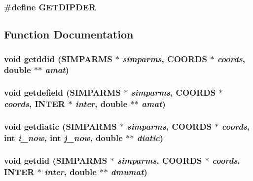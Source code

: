 \subsubsection{\setlength{\rightskip}{0pt plus 5cm}\#define GETDIPDER}\label{energy_2polar_2getdid_8c_e8acea768e4d2fdc6e985d261f4ce131}




\subsection{Function Documentation}
\subsubsection{\setlength{\rightskip}{0pt plus 5cm}void getddid ({\bf SIMPARMS} $\ast$ {\em simparms}, {\bf COORDS} $\ast$ {\em coords}, double $\ast$$\ast$ {\em amat})}\label{energy_2polar_2getdid_8c_3bec01b2ac3a2c818399ae1fd8ce6118}


\subsubsection{\setlength{\rightskip}{0pt plus 5cm}void getdefield ({\bf SIMPARMS} $\ast$ {\em simparms}, {\bf COORDS} $\ast$ {\em coords}, {\bf INTER} $\ast$ {\em inter}, double $\ast$$\ast$ {\em amat})}\label{energy_2polar_2getdid_8c_60064eed375ddf1edd5fadec212de99d}


\subsubsection{\setlength{\rightskip}{0pt plus 5cm}void getdiatic ({\bf SIMPARMS} $\ast$ {\em simparms}, {\bf COORDS} $\ast$ {\em coords}, int {\em i\_\-now}, int {\em j\_\-now}, double $\ast$$\ast$ {\em diatic})}\label{energy_2polar_2getdid_8c_1c6fec36594dae1f1269588c537f854a}


\subsubsection{\setlength{\rightskip}{0pt plus 5cm}void getdid ({\bf SIMPARMS} $\ast$ {\em simparms}, {\bf COORDS} $\ast$ {\em coords}, {\bf INTER} $\ast$ {\em inter}, double $\ast$$\ast$ {\em dmumat})}\label{energy_2polar_2getdid_8c_435b47f9a2e2d0b696f34fd100b1fd50}


